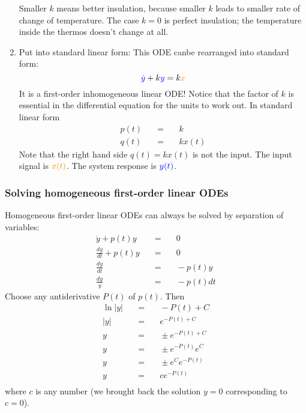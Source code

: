 \begin{enumerate}
  Smaller $k$ means better insulation, because smaller $k$ leads to smaller rate of change of temperature.
  The case $k = 0$ is perfect insulation; the temperature inside the thermos doesn't change at all.
\item {\color{blue} Put into standard linear form: }This ODE canbe rearranged into standard form:
  \begin{equation*}
    {\color{blue}\dot y} + k {\color{blue} y} = k{\color{orange} x}
  \end{equation*}
  It is a first-order inhomogeneous linear ODE!
  \Note Notice that the factor of $k$ is essential in the differential equation for the units to work out.
  In standard linear form
  \begin{eqnarray*}
    p(t) \quad &=& \quad k \\
    q(t) \quad &=& \quad kx(t)
  \end{eqnarray*}
  Note that the right hand side $q(t) = kx(t)$ is not the input.
  The input signal is ${\color{orange} x(t)}$. The system response is ${\color{blue} y(t)}$.
\end{enumerate}
\clearpage

\subsubsection{Solving homogeneous first-order linear ODEs}
Homogeneous first-order linear ODEs can always be solved by separation of variables:
\begin{eqnarray*}
  \dot y + p(t)y \quad &=& \quad 0\\
  \frac{dy}{dt} + p(t)y \quad &=& \quad 0\\
  \frac{dy}{dt} \quad &=& \quad -p(t)y\\
  \frac{dy}{y} \quad &=& \quad -p(t)dt  
\end{eqnarray*}
Choose any antiderivative $P(t)$ of $p(t)$. Then
\begin{eqnarray*}
  \ln |y| \quad &=& \quad -P(t) + C \\
  |y| \quad &=& \quad e^{-P(t) + C} \\
  y \quad &=& \quad \pm e^{-P(t) + C} \\
  y \quad &=& \quad \pm e^{-P(t)}e^{C} \\
  y \quad &=& \quad \pm e^{C}e^{-P(t)} \\
  y \quad &=& \quad ce^{-P(t)} \\
\end{eqnarray*}
where $c$ is any number (we brought back the solution $y = 0$ corresponding to $c = 0$).\\

